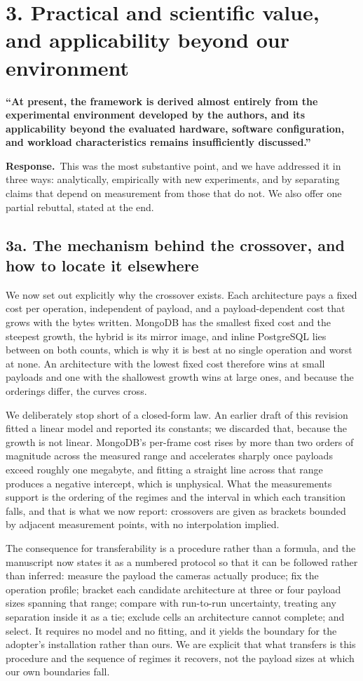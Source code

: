 \documentclass[11pt,a4paper]{article}
\newcommand{\point}[1]{\medskip\noindent\textbf{\color{black!75}#1}\par\smallskip}
\newcommand{\reply}{\noindent\textbf{Response.}\ }
\begin{document}
\section*{3. Practical and scientific value, and applicability beyond our environment}

\point{``At present, the framework is derived almost entirely from the experimental environment
developed by the authors, and its applicability beyond the evaluated hardware, software
configuration, and workload characteristics remains insufficiently discussed.''}

\reply This was the most substantive point, and we have addressed it in three ways: analytically,
empirically with new experiments, and by separating claims that depend on measurement from those
that do not. We also offer one partial rebuttal, stated at the end.

\subsection*{3a. The mechanism behind the crossover, and how to locate it elsewhere}

We now set out explicitly why the crossover exists. Each architecture pays a fixed cost per operation,
independent of payload, and a payload-dependent cost that grows with the bytes written. MongoDB has the
smallest fixed cost and the steepest growth, the hybrid is its mirror image, and inline PostgreSQL lies
between on both counts, which is why it is best at no single operation and worst at none. An architecture
with the lowest fixed cost therefore wins at small payloads and one with the shallowest growth wins at
large ones, and because the orderings differ, the curves cross.

We deliberately stop short of a closed-form law. An earlier draft of this revision fitted a linear model
and reported its constants; we discarded that, because the growth is not linear. MongoDB's per-frame cost
rises by more than two orders of magnitude across the measured range and accelerates sharply once payloads
exceed roughly one megabyte, and fitting a straight line across that range produces a negative intercept,
which is unphysical. What the measurements support is the ordering of the regimes and the interval in which
each transition falls, and that is what we now report: crossovers are given as brackets bounded by adjacent
measurement points, with no interpolation implied.

The consequence for transferability is a procedure rather than a formula, and the manuscript now states it
as a numbered protocol so that it can be followed rather than inferred: measure the payload the cameras
actually produce; fix the operation profile; bracket each candidate architecture at three or four payload
sizes spanning that range; compare with run-to-run uncertainty, treating any separation inside it as a tie;
exclude cells an architecture cannot complete; and select. It requires no model and no fitting, and it
yields the boundary for the adopter's installation rather than ours. We are explicit that what transfers is
this procedure and the sequence of regimes it recovers, not the payload sizes at which our own boundaries
fall.
\end{document}
